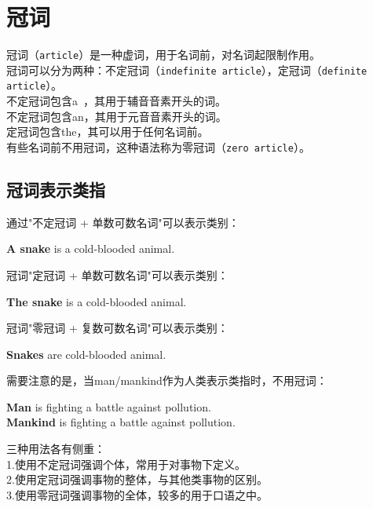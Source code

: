 \documentclass[UTF8]{ctexart}
\newcommand{\littf}[1]{{\hspace{3pt}\ttfamily #1}}
\begin{document}
\newpage

\section{冠词}
    冠词（\texttt{article}）是一种虚词，用于名词前，对名词起限制作用。\\[3mm]
    冠词可以分为两种：不定冠词（\texttt{indefinite article}），定冠词（\texttt{definite article}）。\\[3mm]
    不定冠词包含\littf{a~}，其用于辅音音素开头的词。\\[3mm]
    不定冠词包含\littf{an}，其用于元音音素开头的词。\\[3mm]
    定冠词包含\littf{the}，其可以用于任何名词前。\\[3mm]
    有些名词前不用冠词，这种语法称为零冠词（\texttt{zero article}）。

\subsection{冠词表示类指}
    通过\littf{"不定冠词 + 单数可数名词"}可以表示类别：
    \begin{center}
        \large\ttfamily
        \textbf{A snake} is a cold-blooded animal.\\[6mm]
    \end{center}
    冠词\littf{"定冠词 + 单数可数名词"}可以表示类别：
    \begin{center}
        \large\ttfamily
        \textbf{The snake} is a cold-blooded animal.\\[6mm]
    \end{center}
    冠词\littf{"零冠词 + 复数可数名词"}可以表示类别：
    \begin{center}
        \large\ttfamily
        \textbf{Snakes} are cold-blooded animal.\\[6mm]
    \end{center}
    需要注意的是，当\littf{man/mankind}作为人类表示类指时，不用冠词：
    \begin{center}
        \large\ttfamily
        \textbf{Man} is fighting a battle against pollution.\\[3mm]
        \textbf{Mankind} is fighting a battle against pollution.\\[6mm]
    \end{center}
    三种用法各有侧重：\\[3mm]
    1.使用不定冠词强调个体，常用于对事物下定义。\\[3mm]
    2.使用定冠词强调事物的整体，与其他类事物的区别。\\[3mm]
    3.使用零冠词强调事物的全体，较多的用于口语之中。\\[3mm]
\end{document}
